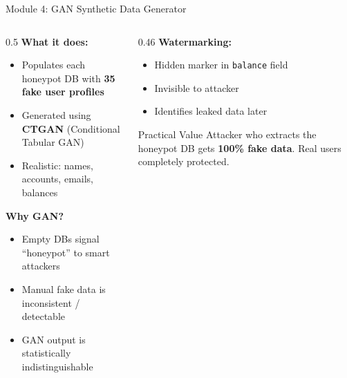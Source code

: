 \documentclass[aspectratio=169,12pt]{beamer}
\begin{document}
\begin{frame}{Module 4: GAN Synthetic Data Generator}
  \begin{columns}[T]
    \begin{column}{0.5\textwidth}
      \textbf{\textcolor{dcCyan}{What it does:}}
      \begin{itemize}
        \item Populates each honeypot DB with \textbf{35 fake user profiles}
        \item Generated using \textbf{CTGAN} (Conditional Tabular GAN)
        \item Realistic: names, accounts, emails, balances
      \end{itemize}
      \vspace{0.3em}
      \textbf{\textcolor{dcCyan}{Why GAN?}}
      \begin{itemize}
        \item Empty DBs signal ``honeypot'' to smart attackers
        \item Manual fake data is inconsistent / detectable
        \item GAN output is statistically indistinguishable
      \end{itemize}
    \end{column}
    \begin{column}{0.46\textwidth}
      \textbf{\textcolor{dcYellow}{Watermarking:}}
      \begin{itemize}
        \item Hidden marker in \texttt{balance} field
        \item Invisible to attacker
        \item Identifies leaked data later
      \end{itemize}
      \vspace{0.4em}
      \begin{block}{Practical Value}
        \small Attacker who extracts the honeypot DB gets
        \textbf{100\% fake data}. Real users completely protected.
      \end{block}
    \end{column}
  \end{columns}
\end{frame}
\end{document}
